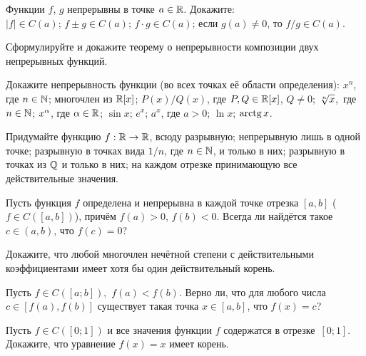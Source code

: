 \documentclass[a4paper,12pt]{article}
\begin{document}
 Функции $f$, $g$ непрерывны в точке $a\in \mathbb{R}$. Докажите: %
\\
 $|f|\in C(a)$;
 $f\pm g\in C(a)$;%
 $f\cdot g\in C(a)$; %
 если %
$g(a) \neq 0$,
то ${f}/{g}\in C(a)$.

Сформулируйте и докажите теорему о непрерывности композиции
двух непрерывных функций.

 Докажите непрерывность функции (во всех точках её области
определения):
 $x^n$, где $n\in\mathbb{N}$;
 многочлен из $\mathbb{R}[x]$;%
 $P(x)/Q(x)$, где $P,Q\in\mathbb{R}[x]$, $Q\ne0$;
 $\root n \of x$,~где~$n\in\mathbb{N}$;
 $x^\alpha$, где $\alpha\in\mathbb{R}$;
 $\sin x$;
 $e^x$;
 $a^x$, где $a>0$;
 $\ln x$;
 $\arctg x$.

 Придумайте функцию  $f:\mathbb{R}\rightarrow\mathbb{R}$, %
 всюду разрывную;
 непрерывную лишь в одной точке;
 разрывную в точках вида $1/n$, где $n\in\mathbb{N}$, и только в них;
 разрывную в точках из $\mathbb{Q}$ и только в них;
 \hspace*{2mm} на каждом отрезке принимающую все действительные значения.

Пусть функция $f$ определена и непрерывна в каждой точке отрезка $[a,b]$ ($f\in C([a,b])$),
причём $f(a) > 0$, $f(b) <0$. Всегда ли найдётся  такое $c\in (a,b)$, что $f(c)=0$?

 Докажите, что любой многочлен нечётной степени
с действительными коэффициентами имеет хотя бы один действительный корень.

Пусть $f\in C([a;b]),$ $f(a) < f(b)$.
Верно ли, что для любого числа $c \in [f(a), f(b)]$ существует такая
точка $x\in [a,b]$, что $f(x) = c$?



Пусть $f\in C([0;1])$ и все значения функции $f$ содержатся в
отрезке~$[0;1]$. Докажите, что уравнение $f(x)=x$ имеет корень.
\end{document}

